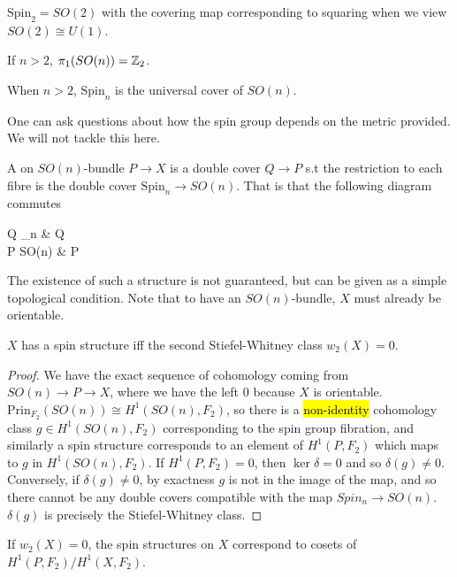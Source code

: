 \documentclass{article}
\begin{document}
\begin{example}
	$\text{Spin}_2 = SO(2)$ with the covering map corresponding to squaring when we view $SO(2) \cong U(1)$.
\end{example}

\begin{lemma}
	If $n>2$, $\pi_1(SO(n)) = \mathbb{Z}_2$. 
\end{lemma}

\begin{prop}
	When $n>2$, $\text{Spin}_n$ is the universal cover of $SO(n)$. 
\end{prop}

\begin{remark}
	One can ask questions about how the spin group depends on the metric provided. We will not tackle this here. 
\end{remark}

\begin{definition}
	A  on $SO(n)$-bundle $P\to X$ is a double cover $Q \to P$ s.t the restriction to each fibre is the double cover $\text{Spin}_n \to SO(n)$. That is that the following diagram commutes
	\begin{tkz}
		Q \times {}_n \arrow[r] \arrow[d, twoheadrightarrow] & Q \arrow[d, twoheadrightarrow]\\
		P \times SO(n) \arrow[r] & P
	\end{tkz}
\end{definition}

The existence of such a structure is not guaranteed, but can be given as a simple topological condition. Note that to have an $SO(n)$-bundle, $X$ must already be orientable. 

\begin{prop}
	$X$ has a spin structure iff the second Stiefel-Whitney class $w_2(X)=0$. 
\end{prop}
\begin{proof}
	We have the exact sequence of cohomology
	coming from $SO(n) \to P \to X$, where we have the left 0 because $X$ is orientable. $\text{Prin}_{F_2}(SO(n)) \cong H^1(SO(n),F_2)$, so there is a \hl{non-identity} cohomology class $g \in H^1(SO(n), F_2)$ corresponding to the spin group fibration, and similarly a spin structure corresponds to an element of $H^1(P,F_2)$ which maps to $g$ in $H^1(SO(n),F_2)$. If $H^1(P,F_2)=0$, then $\ker \delta =0$ and so $\delta(g) \neq 0$. Conversely, if $\delta(g) \neq 0$, by exactness $g$ is not in the image of the map, and so there cannot be any double covers compatible with the map $Spin_n \to SO(n)$. $\delta(g)$ is precisely the Stiefel-Whitney class. 
\end{proof}
\begin{corollary}
	If $w_2(X)=0$, the spin structures on $X$ correspond to cosets of $H^1(P,F_2)/H^1(X,F_2)$. 
\end{corollary}
\end{document}
